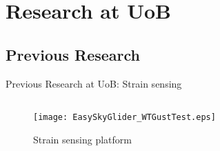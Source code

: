 \documentclass[aspectratio=169]{beamer}            %
\begin{document}

\section{Research at UoB}
\subsection[Previous Research]{Previous Research}
\begin{frame}{Previous Research at UoB: Strain sensing}

  \begin{columns}
    \begin{column}{0.6\textwidth}
				\begin{figure}[!htb]
	  			\centering
	  			\texttt{[image: EasySkyGlider\_WTGustTest.eps]}
	  			\caption{Strain sensing platform}
	  			\label{Fig:StrainExpPlatform}
				\end{figure}
		\end{column}
		\begin{column}{0.4\textwidth}
			
		\end{column}
	\end{columns}

\end{frame}
\end{document}
